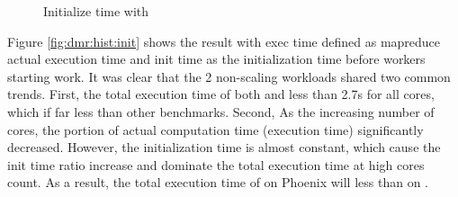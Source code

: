 \begin{figure}[htpb]
	\centering
	\caption{Initialize time with \myds}
	\label{fig:init}
\end{figure}




Figure \ref{fig:dmr:hist:init} shows the result with exec time defined as mapreduce actual execution time and init time as the initialization time before workers starting work. 
It was clear that the 2 non-scaling workloads shared two common trends. 
First, the total execution time of both  and  less than 2.7s for all cores, which if far less than other benchmarks. 
Second, As the increasing number of cores, the portion of actual computation time (execution time) significantly decreased.
However, the initialization time is almost constant, which cause the init time ratio increase and dominate the total execution time at high cores count. 
As a result, the total execution time of  on Phoenix will less than on \myds.





